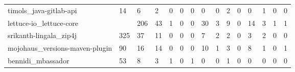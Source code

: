 \begin{table}[]
\begin{tabular}{lllllllllllllll}
        timols\_java-gitlab-api              & 14    & 6                 & 2                  & 0                    & 0                      & 0                     & 0                    & 0                      & 2                     & 0  & 0  & 1  & 0  & 0  \\
        lettuce-io\_lettuce-core             &     & 206               & 43                 & 1                    & 0                      & 0                     & 30                   & 3                      & 9                     & 0  & 14 & 3  & 1  & 1  \\
        srikanth-lingala\_zip4j              & 325   & 37                & 11                 & 0                    & 0                      & 0                     & 7                    & 2                      & 2                     & 0  & 3  & 2  & 0  & 0  \\
        mojohaus\_versions-maven-plugin      & 90    & 16                & 14                 & 0                    & 0                      & 0                     & 10                   & 1                      & 3                     & 0  & 8  & 1  & 0  & 1  \\
        bennidi\_mbassador                   & 53    & 8                 & 3                  & 1                    & 0                      & 1                     & 0                    & 0                      & 1                     & 0  & 0  & 0  & 0  & 0
    \end{tabular}
\end{table}